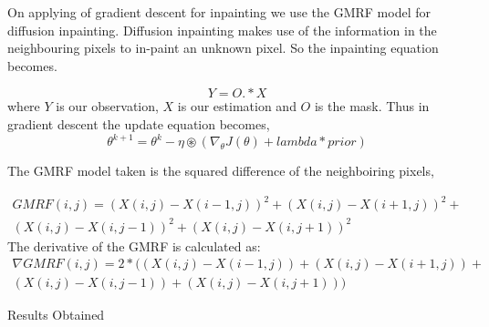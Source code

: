 \documentclass[a4paper, 15pt]{article}
\begin{document}
	\par
	On applying of gradient descent for inpainting we use the GMRF model for diffusion inpainting.
	Diffusion inpainting makes use of the information in the neighbouring pixels to in-paint an unknown pixel. So the inpainting equation becomes. 
	\par
	\begin{equation}
	Y = O.*X
	\end{equation}
	where $Y$ is our observation, $X$ is our estimation and $O$ is the mask. Thus in gradient descent the update equation becomes,
	\begin{equation}
	\theta^{k+1} = \theta^{k} - \eta\circledast(\nabla_{\theta}J(\theta) + lambda*prior)
	\end{equation}
	\par
	The GMRF model taken is the squared difference of the neighboiring pixels, 
	\par
	\begin{equation}
	\begin{split}
	GMRF(i, j) = (X(i,j) - X(i-1, j))^2 + (X(i,j) - X(i+1, j))^2 + \\ (X(i,j) - X(i, j-1))^2 + (X(i,j) - X(i, j+1))^2
	\end{split}	
	\end{equation}
	The derivative of the GMRF is calculated as:
	\begin{equation}
	\begin{split}
	\nabla GMRF(i, j) = 2*((X(i,j) - X(i-1, j)) + (X(i,j) - X(i+1, j)) + \\ (X(i,j) - X(i, j-1)) + (X(i,j) - X(i, j+1)))
	\end{split}
	\end{equation}
	\newpage
	\begin{center}
		{\fontsize{20}{30}\selectfont Results Obtained}\
	\end{center}
\end{document}
